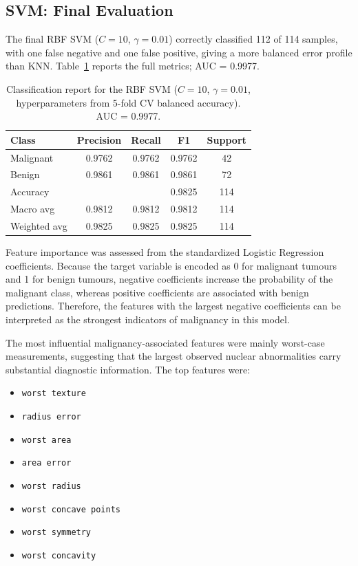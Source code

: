 \documentclass[twocolumn, fontsize=10pt]{article}
\begin{document}
\subsection{SVM: Final Evaluation}

The final RBF SVM ($C = 10$, $\gamma = 0.01$) correctly classified 112 of 114 samples, with one false negative and one false positive, giving a more balanced error profile than KNN. Table~\ref{tab:svm_report} reports the full metrics; AUC = 0.9977.

\begin{table}[H]
\centering
\small
\setlength{\tabcolsep}{4pt}
\begin{tabular}{lcccc}
\toprule
\textbf{Class} & \textbf{Precision} & \textbf{Recall} & \textbf{F1} & \textbf{Support} \\
\midrule
Malignant    & 0.9762 & 0.9762 & 0.9762 & 42 \\
Benign       & 0.9861 & 0.9861 & 0.9861 & 72 \\
\midrule
Accuracy     & &  & {0.9825} & 114 \\
Macro avg    & 0.9812 & 0.9812 & 0.9812 & 114 \\
Weighted avg & 0.9825 & 0.9825 & 0.9825 & 114 \\
\bottomrule
\end{tabular}
\caption{Classification report for the RBF SVM ($C=10$, $\gamma=0.01$,
hyperparameters from 5-fold CV balanced accuracy). AUC = 0.9977.}
\label{tab:svm_report}
\end{table}


Feature importance was assessed from the standardized Logistic Regression coefficients. Because the target variable is encoded as 0 for malignant tumours and 1 for benign tumours, negative coefficients increase the probability of the malignant class, whereas positive coefficients are associated with benign predictions. Therefore, the features with the largest negative coefficients can be interpreted as the strongest indicators of malignancy in this model.

The most influential malignancy-associated features were mainly worst-case measurements, suggesting that the largest observed nuclear abnormalities carry substantial diagnostic information. The top features were:

\begin{itemize}[noitemsep, topsep=0pt, label=\tiny$\bullet$]
    \item \texttt{worst texture}
    \item \texttt{radius error}
    \item \texttt{worst area}
    \item \texttt{area error}
    \item \texttt{worst radius}
    \item \texttt{worst concave points}
    \item \texttt{worst symmetry}
    \item \texttt{worst concavity}

\end{itemize}
\end{document}

